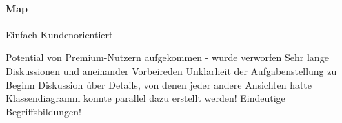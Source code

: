 %
%
\paragraph{Map}
Einfach
Kundenorientiert

Potential von Premium-Nutzern aufgekommen - wurde verworfen
Sehr lange Diskussionen und aneinander Vorbeireden
Unklarheit der Aufgabenstellung zu Beginn
Diskussion über Details, von denen jeder andere Ansichten hatte
Klassendiagramm konnte parallel dazu erstellt werden!
Eindeutige Begriffsbildungen!

